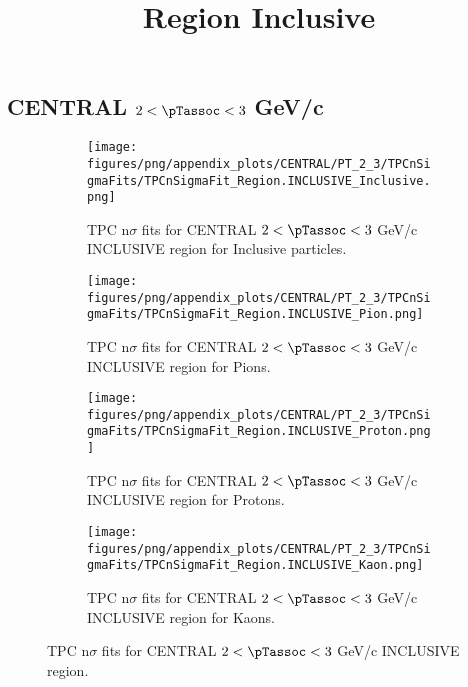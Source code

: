     
            \subsection*{CENTRAL $2 < \pTassoc < 3$ GeV/c}
            \begin{figure}[H]
                \title{Region Inclusive}
                \begin{subfigure}[b]{0.5\textwidth}
                    \centering
                    \texttt{[image: figures/png/appendix\_plots/CENTRAL/PT\_2\_3/TPCnSigmaFits/TPCnSigmaFit\_Region.INCLUSIVE\_Inclusive.png]}
                    \caption{TPC n$\sigma$ fits for CENTRAL $2 < \pTassoc < 3$ GeV/c INCLUSIVE region for Inclusive particles.}
                    \label{fig:appendix_CENTRAL_$2 < \pTassoc < 3$ GeV/c_INCLUSIVE_Inclusive}
                \end{subfigure}
                \begin{subfigure}[b]{0.5\textwidth}
                    \centering
                    \texttt{[image: figures/png/appendix\_plots/CENTRAL/PT\_2\_3/TPCnSigmaFits/TPCnSigmaFit\_Region.INCLUSIVE\_Pion.png]}
                    \caption{TPC n$\sigma$ fits for CENTRAL $2 < \pTassoc < 3$ GeV/c INCLUSIVE region for Pions.}
                    \label{fig:appendix_CENTRAL_$2 < \pTassoc < 3$ GeV/c_INCLUSIVE_Pion}
                \end{subfigure}
                \begin{subfigure}[b]{0.5\textwidth}
                    \centering
                    \texttt{[image: figures/png/appendix\_plots/CENTRAL/PT\_2\_3/TPCnSigmaFits/TPCnSigmaFit\_Region.INCLUSIVE\_Proton.png]}
                    \caption{TPC n$\sigma$ fits for CENTRAL $2 < \pTassoc < 3$ GeV/c INCLUSIVE region for Protons.}
                    \label{fig:appendix_CENTRAL_$2 < \pTassoc < 3$ GeV/c_INCLUSIVE_Proton}
                \end{subfigure}
                \begin{subfigure}[b]{0.5\textwidth}
                    \centering
                    \texttt{[image: figures/png/appendix\_plots/CENTRAL/PT\_2\_3/TPCnSigmaFits/TPCnSigmaFit\_Region.INCLUSIVE\_Kaon.png]}
                    \caption{TPC n$\sigma$ fits for CENTRAL $2 < \pTassoc < 3$ GeV/c INCLUSIVE region for Kaons.}
                    \label{fig:appendix_CENTRAL_$2 < \pTassoc < 3$ GeV/c_INCLUSIVE_Kaon}
                \end{subfigure}
                \caption{TPC n$\sigma$ fits for CENTRAL $2 < \pTassoc < 3$ GeV/c INCLUSIVE region.}
                \label{fig:appendix_CENTRAL_$2 < \pTassoc < 3$ GeV/c_INCLUSIVE}
            \end{figure}
